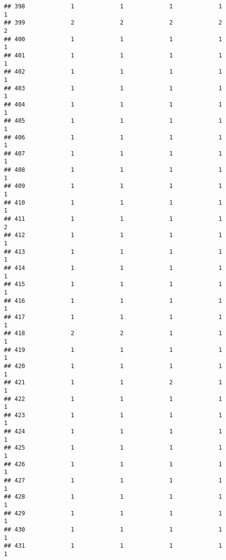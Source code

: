 \documentclass[
]{article}
\begin{document}
\begin{verbatim}
## 398             1             1             1             1             1
## 399             2             2             2             2             2
## 400             1             1             1             1             1
## 401             1             1             1             1             1
## 402             1             1             1             1             1
## 403             1             1             1             1             1
## 404             1             1             1             1             1
## 405             1             1             1             1             1
## 406             1             1             1             1             1
## 407             1             1             1             1             1
## 408             1             1             1             1             1
## 409             1             1             1             1             1
## 410             1             1             1             1             1
## 411             1             1             1             1             2
## 412             1             1             1             1             1
## 413             1             1             1             1             1
## 414             1             1             1             1             1
## 415             1             1             1             1             1
## 416             1             1             1             1             1
## 417             1             1             1             1             1
## 418             2             2             1             1             1
## 419             1             1             1             1             1
## 420             1             1             1             1             1
## 421             1             1             2             1             1
## 422             1             1             1             1             1
## 423             1             1             1             1             1
## 424             1             1             1             1             1
## 425             1             1             1             1             1
## 426             1             1             1             1             1
## 427             1             1             1             1             1
## 428             1             1             1             1             1
## 429             1             1             1             1             1
## 430             1             1             1             1             1
## 431             1             1             1             1             1

\end{verbatim}
\end{document}
